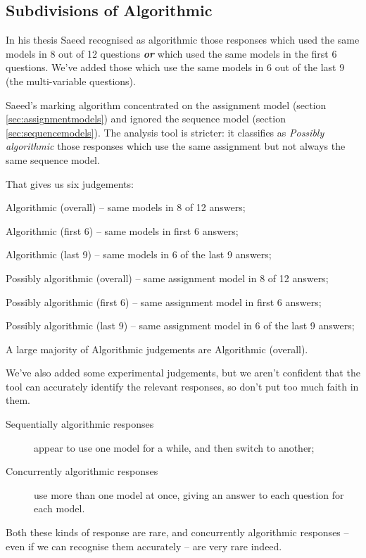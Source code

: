 \documentclass[11pt,a4paper]{article}
\newcommand{\secref}[1]{section \ref{sec:#1}}
\begin{document}
\subsection{Subdivisions of Algorithmic}

In his thesis Saeed recognised as algorithmic those responses which used the same models in 8 out of 12 questions \textbf{\textit{or}} which used the same models in the first 6 questions. We've added those which use the same models in 6 out of the last 9 (the multi-variable questions). 

Saeed's marking algorithm concentrated on the assignment model (\secref{assignmentmodels}) and ignored the sequence model (\secref{sequencemodels}). The analysis tool is stricter: it classifies as \emph{Possibly algorithmic} those responses which use the same assignment but not always the same sequence model. 

That gives us six judgements:
\begin{description*}
\item [Algorithmic (overall)] -- same models in 8 of 12 answers;
\item [Algorithmic (first 6)] -- same models in first 6 answers;
\item [Algorithmic (last 9)] -- same models in 6 of the last 9 answers;
\item [Possibly algorithmic (overall)] -- same assignment model in 8 of 12 answers;
\item [Possibly algorithmic (first 6)] -- same assignment model in first 6 answers;
\item [Possibly algorithmic (last 9)] -- same assignment model in 6 of the last 9 answers;
\end{description*}
A large majority of Algorithmic judgements are Algorithmic (overall). 

We've also added some experimental judgements, but we aren't confident that the tool can accurately identify the relevant responses, so don't put too much faith in them. 
\begin{description}
\item[Sequentially algorithmic responses] appear to use one model for a while, and then switch to another;
\item[Concurrently algorithmic responses] use more than one model at once, giving an answer to each question for each model.
\end{description}
Both these kinds of response are rare, and concurrently algorithmic responses -- even if we can recognise them accurately -- are very rare indeed.
\end{document}
